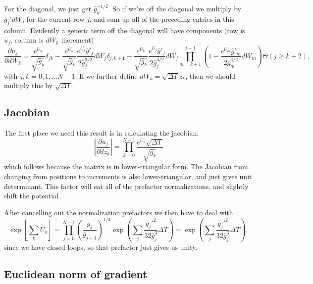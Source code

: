 For the diagonal, we just get $\bar{g}_k^{-1/2}$. 
So if we're off the diagonal we multiply by $\bar{g}_j' dW_j$ for the current row $j$, and sum up all of the preceding entries in this column.   
Evidently a generic term off the diagonal will have components (row is $u_j$, column is $dW_k$ increment)
\begin{equation}
\boxed{\frac{\partial u_j}{\partial dW_k} = \frac{e^{U_k}}{\sqrt{\bar{g}_k}}\delta_{jk} - \frac{e^{U_k}}{\sqrt{\bar{g}_k}}\frac{e^{U_j}\bar{g}'_j}{2\bar{g}^{3/2}_j}dW_j\delta_{j,k+1} - \frac{e^{U_k}}{\sqrt{\bar{g}_k}}\frac{e^{U_j}\bar{g}'_j}{2\bar{g}^{3/2}_j}dW_j\prod_{m=k+1}^{j-1} \left(1- \frac{e^{U_m}\bar{g}'_m}{2\bar{g}^{3/2}_m}dW_m\right)\Theta(j\ge k+2),}
\end{equation}
with $j,k=0,1,\ldots N-1$. If we further define $dW_k = \sqrt{\Delta T}z_k$, then we should multiply this by $\sqrt{\Delta T}$.  

\subsection{Jacobian}

The first place we need this result is in calculating the jacobian:
\begin{equation}
\left|\frac{\partial u_j}{\partial dz_k}\right| = \prod_{k=0}^{N-1}\frac{e^{U_k}\sqrt{\Delta T}}{\sqrt{\bar{g}_k}}
\end{equation}
which follows because the matrix is in lower-triangular form.  The Jacobian from changing from positions to increments is also lower-triangular, and just gives unit determinant.  This factor will eat all of the prefactor normalizations, and slightly shift the potential.  

After cancelling out the normalization prefactors we then have to deal with 
\begin{equation}
\exp\left[\sum_k U_k\right] = \prod_{j=0}^{N-1}\left( \frac{\bar{g}_j}{\bar{g}_{j+1}}\right)^{1/4}\exp\left( \sum_j\frac{\bar{g}_j'^2}{32 \bar{g}_j^3}\Delta T\right) = \exp\left( \sum_j\frac{\bar{g}_j'^2}{32 \bar{g}_j^3}\Delta T\right),
\end{equation}
since we have closed loops, so that prefactor just gives us unity.  


\subsection{Euclidean norm of gradient}

